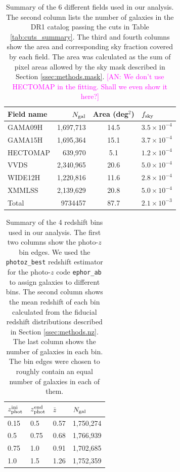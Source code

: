 \documentclass[a4paper,11pt]{article}
\newcommand{\an}[1]{{\textcolor{magenta}{[AN: #1]}}}
\begin{document}
  \begin{table}
  \centering
  \begin{tabular}{|l|r|c|l|}
   \hline
   {\bf Field name} & $N_{\rm gal}$ & {\bf Area} (deg$^2$) & $f_{\rm sky}$ \\
   \hline
   GAMA09H  & 1,697,713 & 14.5 & $3.5\times10^{-4}$ \\
   GAMA15H  & 1,695,364 & 15.1 & $3.7\times10^{-4}$ \\
   HECTOMAP &   639,970 &  5.1 & $1.2\times10^{-4}$ \\
   VVDS     & 2,340,965 & 20.6 & $5.0\times10^{-4}$ \\
   WIDE12H  & 1,220,816 & 11.6 & $2.8\times10^{-4}$ \\
   XMMLSS   & 2,139,629 & 20.8 & $5.0\times10^{-4}$ \\
   \hline
   Total    & 9734457 & 87.7 & $2.1\times10^{-3}$ \\
   \hline
  \end{tabular}
  \caption{Summary of the 6 different fields used in our analysis. The second column lists the number of galaxies in the DR1 catalog passing the cuts in Table \ref{tab:cuts_summary}. The third and fourth columns show the area and corresponding sky fraction covered by each field. The area was calculated as the sum of pixel areas allowed by the sky mask described in Section \ref{ssec:methods.mask}. \an{We don't use HECTOMAP in the fitting. Shall we even show it here?}} \label{tab:field_summary}
  \end{table}  

  \begin{table}
  \centering
  \begin{tabular}{|l|l|l|l|}
    \hline
    $z_{\rm phot}^{\rm ini}$ & $z_{\rm phot}^{\rm end}$ & $\bar{z}$ & $N_{\rm gal}$ \\
    \hline
    0.15 & 0.5  & 0.57 & 1,750,274 \\
    0.5  & 0.75 & 0.68 & 1,766,939 \\
    0.75 & 1.0  & 0.91 & 1,702,685 \\
    1.0  & 1.5  & 1.26 & 1,752,359 \\
    \hline
  \end{tabular}
  \caption{Summary of the 4 redshift bins used in our analysis. The first two columns show the photo-$z$ bin edges. We used the {\tt photoz\_best} redshift estimator for the photo-$z$ code {\tt ephor\_ab} to assign galaxies to different bins. The second column shows the mean redshift of each bin calculated from the fiducial redshift distributions described in Section \ref{ssec:methods.nz}. The last column shows the number of galaxies in each bin. The bin edges were chosen to roughly contain an equal number of galaxies in each of them.} \label{tab:bins_summary}
  \end{table}
  
\end{document}
